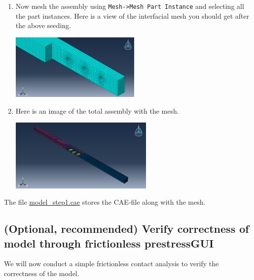 \documentclass[11pt]{article}
\begin{document}
\begin{enumerate}
\begin{center}
\end{center}
\item Now mesh the assembly using \texttt{Mesh->Mesh Part Instance} and selecting all the part instances.
Here is a view of the interfacial mesh you should get after the above seeding.
\begin{center}
\includegraphics[width=0.5\textwidth]{./figs/mesh.png}
\end{center}
\item Here is an image of the total assembly with the mesh.
\begin{center}
\includegraphics[width=0.55\textwidth]{./figs/fullmesh.png}
\end{center}
\end{enumerate}

The file \href{https://github.com/Nidish96/Abaqus4Joints/blob/main/assets/assembly/model\_step1.cae}{model\_step1.cae} stores the CAE-file along with the mesh.
\subsection{(Optional, recommended) Verify correctness of model through frictionless prestress\hfill{}\textsc{GUI}}
\label{sec:orgcf3412d}
We will now conduct a simple frictionless contact analysis to verify the correctness of the model.
\end{document}
